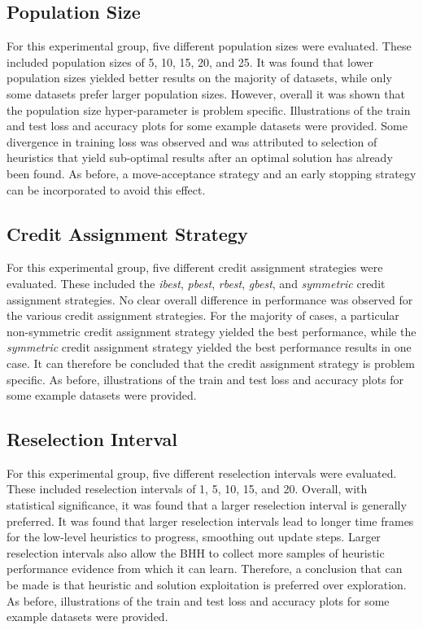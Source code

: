 \subsection{Population Size}
\label{sec:conclusion:results:summary:population_size}

For this experimental group, five different population sizes were evaluated. These included population sizes of 5, 10, 15, 20, and 25. It was found that lower population sizes yielded better results on the majority of datasets, while only some datasets prefer larger population sizes. However, overall it was shown that the population size hyper-parameter is problem specific. Illustrations of the train and test loss and accuracy plots for some example datasets were provided. Some divergence in training loss was observed and was attributed to selection of heuristics that yield sub-optimal results after an optimal solution has already been found. As before, a move-acceptance strategy and an early stopping strategy can be incorporated to avoid this effect.

\subsection{Credit Assignment Strategy}
\label{sec:conclusion:results:summary:credit}

For this experimental group, five different credit assignment strategies were evaluated. These included the \textit{ibest}, \textit{pbest}, \textit{rbest}, \textit{gbest}, and \textit{symmetric} credit assignment strategies. No clear overall difference in performance was observed for the various credit assignment strategies. For the majority of cases, a particular non-symmetric credit assignment strategy yielded the best performance, while the \textit{symmetric} credit assignment strategy yielded the best performance results in one case. It can therefore be concluded that the credit assignment strategy is problem specific. As before, illustrations of the train and test loss and accuracy plots for some example datasets were provided.

\subsection{Reselection Interval}
\label{sec:conclusion:results:summary:reselection}

For this experimental group, five different reselection intervals were evaluated. These included reselection intervals of 1, 5, 10, 15, and 20. Overall, with statistical significance, it was found that a larger reselection interval is generally preferred. It was found that larger reselection intervals lead to longer time frames for the low-level heuristics to progress, smoothing out update steps. Larger reselection intervals also allow the \acs{BHH} to collect more samples of heuristic performance evidence from which it can learn. Therefore, a conclusion that can be made is that heuristic and solution exploitation is preferred over exploration. As before, illustrations of the train and test loss and accuracy plots for some example datasets were provided.

